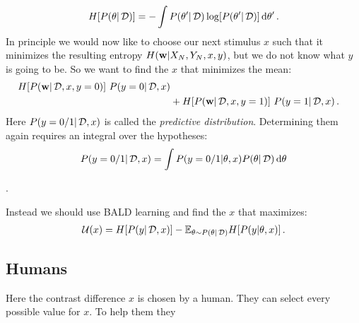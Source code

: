 \begin{align}
	H[{P(\theta | \,\mathcal{D})}] = - \int {P(\theta' | \,\mathcal{D})} \log[{P(\theta' | \,\mathcal{D})}] \,\mathrm{d} \theta' \,.
\end{align}
In principle we would now like to choose our next stimulus $x$ such that it minimizes the resulting entropy $H({\bf w} | X_N, Y_N, x, y)$, but we do not know what $y$ is going to be. So we want to find the $x$ that minimizes the mean:
\begin{align}
	H[{P({\bf w} | \,\mathcal{D}, x, y = 0)}] ~
	{P(y = 0 | \,\mathcal{D}, x)} \\
	&+
	H[{P({\bf w} | \,\mathcal{D}, x, y = 1)}] ~
	{P(y = 1 | \,\mathcal{D}, x)} \,.
\end{align}
Here ${P(y = 0/1 | \,\mathcal{D}, x)}$ is called the \emph{predictive distribution}. Determining them again requires an integral over the hypotheses:
\begin{align}
	{P(y = 0/1 | \,\mathcal{D}, x)}
	= \int {P(y = 0/1 | \theta, x)} {P(\theta| \,\mathcal{D})} \,\mathrm{d} \theta
\end{align}

.

Instead we should use BALD learning and find the $x$ that maximizes:
\begin{align}
	\mathcal{U}(x) = H[{P(y | \,\mathcal{D}, x)}]
	- \mathbb{E}_{\theta \sim {P(\theta| \,\mathcal{D})}} H[{P(y | \theta, x)}] \,.
\end{align}

\subsection{Humans} %
\label{sub:humans}
Here the contrast difference $x$ is chosen by a human. They can select every possible value for $x$. To help them they




